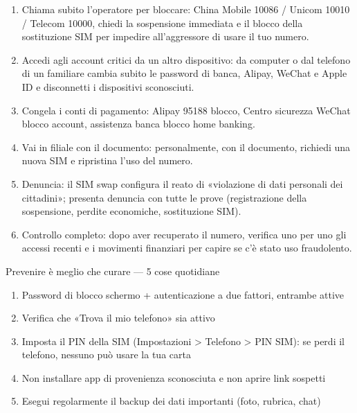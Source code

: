 \begin{enumerate}
  \item Chiama subito l'operatore per bloccare: China Mobile 10086 / Unicom 10010 / Telecom 10000, chiedi la sospensione immediata e il blocco della sostituzione SIM per impedire all'aggressore di usare il tuo numero.
  \item Accedi agli account critici da un altro dispositivo: da computer o dal telefono di un familiare cambia subito le password di banca, Alipay, WeChat e Apple ID e disconnetti i dispositivi sconosciuti.
  \item Congela i conti di pagamento: Alipay 95188 blocco, Centro sicurezza WeChat blocco account, assistenza banca blocco home banking.
  \item Vai in filiale con il documento: personalmente, con il documento, richiedi una nuova SIM e ripristina l'uso del numero.
  \item Denuncia: il SIM swap configura il reato di «violazione di dati personali dei cittadini»; presenta denuncia con tutte le prove (registrazione della sospensione, perdite economiche, sostituzione SIM).
  \item Controllo completo: dopo aver recuperato il numero, verifica uno per uno gli accessi recenti e i movimenti finanziari per capire se c'è stato uso fraudolento.
\end{enumerate}

\begin{tcbwarn}{Prevenire è meglio che curare — 5 cose quotidiane}
\begin{enumerate}
  \item Password di blocco schermo + autenticazione a due fattori, entrambe attive
  \item Verifica che «Trova il mio telefono» sia attivo
  \item Imposta il PIN della SIM (Impostazioni > Telefono > PIN SIM): se perdi il telefono, nessuno può usare la tua carta
  \item Non installare app di provenienza sconosciuta e non aprire link sospetti
  \item Esegui regolarmente il backup dei dati importanti (foto, rubrica, chat)
\end{enumerate}

\end{tcbwarn}

